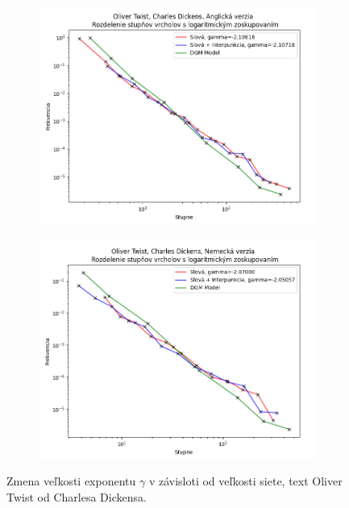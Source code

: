 \begin{figure}[htbp]
    \centering
    \begin{subfigure}[b]{0.9\textwidth}
        \includegraphics[width=\textwidth]{images/lbdegdist/Screenshot_5.png}
    \end{subfigure}

    \vspace{0.3cm}

    \begin{subfigure}[b]{0.9\textwidth}
        \includegraphics[width=\textwidth]{images/lbdegdist/Screenshot_6.png}
    \end{subfigure}
    
    \vspace{0.3cm}
    \caption{Zmena veľkosti exponentu $\gamma$ v závisloti od veľkosti siete, text Oliver Twist od Charlesa Dickensa.}
\end{figure}

